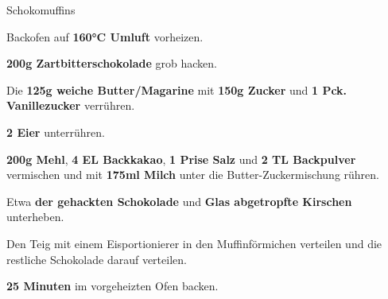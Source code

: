 \begin{recipe}[]{Schokomuffins} %

\step
Backofen auf \textbf{160°C Umluft} vorheizen.

\step
\textbf{200g Zartbitterschokolade} grob hacken.

\step
Die \textbf{125g weiche Butter/Magarine} mit \textbf{150g Zucker} und \textbf{1 Pck. Vanillezucker} verrühren.

\step
\textbf{2 Eier} unterrühren.

\step
\textbf{200g Mehl}, \textbf{4 EL Backkakao}, \textbf{1 Prise Salz} und \textbf{2 TL Backpulver} vermischen und mit \textbf{175ml Milch} unter die Butter-Zuckermischung rühren.

\step
Etwa \textbf{ der gehackten Schokolade} und \textbf{ Glas abgetropfte Kirschen} unterheben.

\step
Den Teig mit einem Eisportionierer in den Muffinförmichen verteilen und die restliche Schokolade darauf verteilen.

\step
\textbf{25 Minuten} im vorgeheizten Ofen backen.

\end{recipe}
